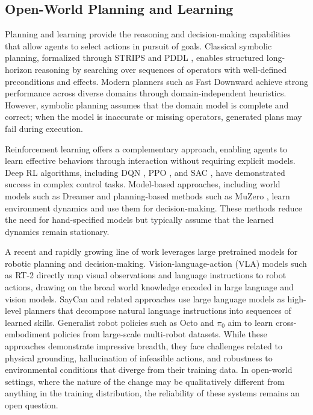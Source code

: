 \subsection{Open-World Planning and Learning}
\label{sec:rw_planning_learning}

Planning and learning provide the reasoning and decision-making capabilities that allow agents to select actions in pursuit of goals. Classical symbolic planning, formalized through STRIPS \citep{fikes1971strips} and PDDL \citep{mcdermott1998pddl}, enables structured long-horizon reasoning by searching over sequences of operators with well-defined preconditions and effects. Modern planners such as Fast Downward \citep{helmert2006fast} achieve strong performance across diverse domains through domain-independent heuristics. However, symbolic planning assumes that the domain model is complete and correct; when the model is inaccurate or missing operators, generated plans may fail during execution.

Reinforcement learning offers a complementary approach, enabling agents to learn effective behaviors through interaction without requiring explicit models. Deep RL algorithms, including DQN \citep{mnih2015human}, PPO \citep{schulman2017proximal}, and SAC \citep{haarnoja2018soft}, have demonstrated success in complex control tasks. Model-based approaches, including world models such as Dreamer \citep{hafner2023mastering} and planning-based methods such as MuZero \citep{schrittwieser2020mastering}, learn environment dynamics and use them for decision-making. These methods reduce the need for hand-specified models but typically assume that the learned dynamics remain stationary.

A recent and rapidly growing line of work leverages large pretrained models for robotic planning and decision-making. Vision-language-action (VLA) models such as RT-2 \citep{pmlr-v229-zitkovich23a} directly map visual observations and language instructions to robot actions, drawing on the broad world knowledge encoded in large language and vision models. SayCan \citep{ahn2022can} and related approaches \citep{huang2022language} use large language models as high-level planners that decompose natural language instructions into sequences of learned skills. Generalist robot policies such as Octo \citep{team2024octo} and $\pi_0$ \citep{black2024pi_0} aim to learn cross-embodiment policies from large-scale multi-robot datasets. While these approaches demonstrate impressive breadth, they face challenges related to physical grounding, hallucination of infeasible actions, and robustness to environmental conditions that diverge from their training data. In open-world settings, where the nature of the change may be qualitatively different from anything in the training distribution, the reliability of these systems remains an open question.
